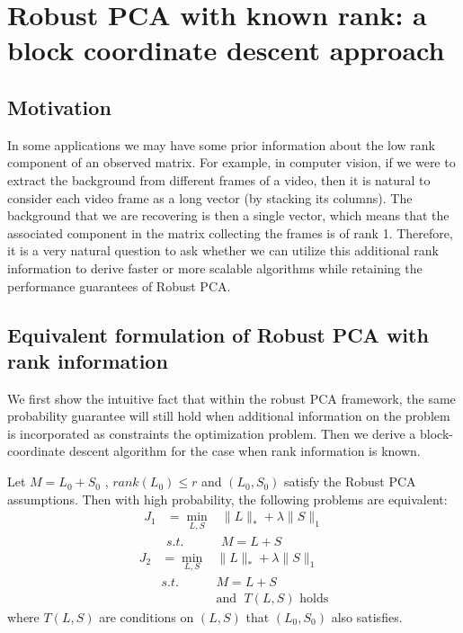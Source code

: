 \newpage
\section{Robust PCA with known rank: a block coordinate descent approach}

\subsection{Motivation}
In some applications we may have some prior information about the low rank component of an observed matrix. For example, in computer vision, if we were to extract the background from different frames of a video, then it is natural to consider each video frame as a long vector (by stacking its columns). The background that we are recovering is then a single vector, which means that the associated component in the matrix collecting the frames is of rank 1. Therefore, it is a very natural question to ask whether we can utilize this additional rank information to derive faster or more scalable algorithms while retaining the performance guarantees of Robust PCA.



\subsection{Equivalent formulation of Robust PCA with rank information}

We first show the intuitive fact that within the robust PCA framework, the same probability guarantee will still hold when additional information on the problem is incorporated as constraints the optimization problem. Then we derive a block-coordinate descent algorithm for the case when rank information is known.
\begin{prop}
\label{prop:restriction prob}Let $M=L_{0}+S_{0}$ , $rank(L_{0})\le r$ and $(L_0,S_0)$
satisfy the Robust PCA assumptions. Then with high probability, the
following problems are equivalent:
%
\begin{eqnarray}
J_{1} & =\min_{L,S} & \|L\|_{*}+\lambda\|S\|_{1}\label{eq:general}\\
 & s.t. & M=L+S\nonumber
\end{eqnarray}
%
\begin{eqnarray}
J_{2} & =\min_{L,S} & \|L\|_{*}+\lambda\|S\|_{1}\label{eq:restricted}\\
 & s.t. & M=L+S\nonumber \\
 &  & \text{and }\;T(L,S)\text{ holds}\nonumber
\end{eqnarray}
%
where $T(L,S)$ are conditions on $(L,S)$ that $(L_{0},S_{0})$ also
satisfies.
\end{prop}

